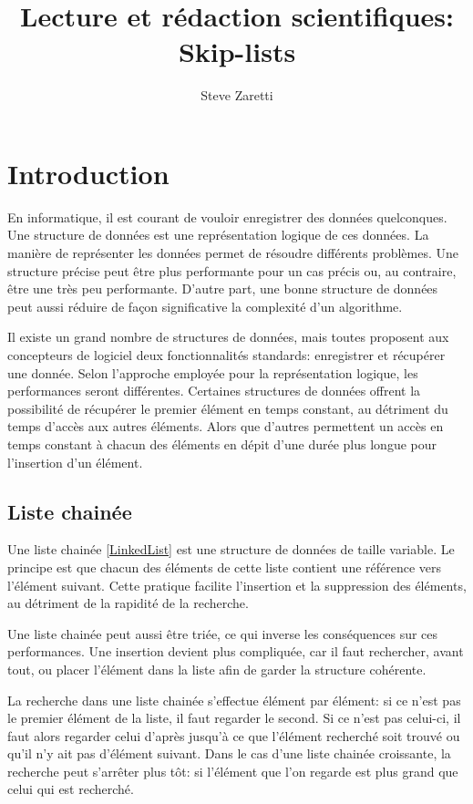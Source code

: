 \documentclass[hidelinks,a4paper, 12pt]{article}
\title{Lecture et rédaction scientifiques: \\Skip-lists }
\author{Steve Zaretti}
\begin{document}
	
	\maketitle
	\newpage
	\tableofcontents
	\newpage
	
	\section{Introduction}
	En informatique, il est courant de vouloir enregistrer des données quelconques. Une structure de données est une représentation logique de ces données. La manière de représenter les données permet de résoudre  différents problèmes. Une structure précise peut être plus performante pour un cas précis ou, au contraire, être une très peu performante. D'autre part, une bonne structure de données peut aussi réduire de façon significative la complexité d'un algorithme.
	
	Il existe un grand nombre de structures de données, mais toutes proposent aux concepteurs de logiciel deux fonctionnalités standards: enregistrer et récupérer une donnée. Selon l'approche employée pour la représentation logique, les performances seront différentes. Certaines structures de données offrent la possibilité de récupérer le premier élément en temps constant, au détriment du temps d'accès aux autres éléments. Alors que d'autres permettent un accès en temps constant à chacun des éléments en dépit d'une durée plus longue pour l'insertion d'un élément.
	
	\subsection{Liste chainée}
	Une liste chainée \ref{LinkedList} est une structure de données de taille variable. Le principe est que chacun des éléments de cette liste contient une référence vers l'élément suivant. Cette pratique facilite l'insertion et la suppression des éléments, au détriment de la rapidité de la recherche.
	
	Une liste chainée peut aussi être triée, ce qui inverse les conséquences sur ces performances. Une insertion devient plus compliquée, car il faut rechercher, avant tout, ou placer l'élément dans la liste afin de garder la structure cohérente.
	
	La recherche dans une liste chainée s'effectue élément par élément: si ce n'est pas le premier élément de la liste, il faut regarder le second. Si ce n'est pas celui-ci, il faut alors regarder celui d'après jusqu'à ce que l'élément recherché soit trouvé ou qu'il n'y ait pas d'élément suivant. Dans le cas d'une liste chainée croissante, la recherche peut s'arrêter plus tôt: si l'élément que l'on regarde est plus grand que celui qui est recherché.
	
\end{document}
